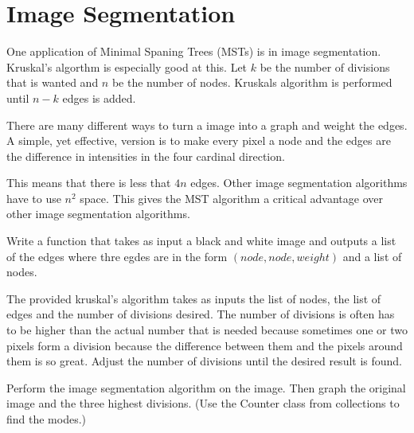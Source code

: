 \label{Ch:MSTImgSeg}


\section*{Image Segmentation}


One application of Minimal Spaning Trees (MSTs) is in image segmentation. Kruskal's algorthm is especially good at this. Let $k$ be the number of divisions that is wanted and $n$ be the number of nodes. Kruskals algorithm is performed until $n-k$ edges is added.

There are many different ways to turn a image into a graph and weight the edges. A simple, yet effective, version is to make every pixel a node and the edges are the difference in intensities in the four cardinal direction. 

This means that there is less that $4n$ edges. Other image segmentation algorithms have to use $n^2$ space. This gives the MST algorithm a critical advantage over other image segmentation algorithms. 

\begin{problem}
Write a function that takes as input a black and white image and outputs a list of the edges where thre egdes are in the form $(node,node,weight)$ and a list of nodes.
\end{problem}

The provided kruskal's algorithm takes as inputs the list of nodes, the list of edges and the number of divisions desired. The number of divisions is often has to be higher than the actual number that is needed because sometimes one or two pixels form a division because the difference between them and the pixels around them is so great. Adjust the number of divisions until the desired result is found.

\begin{problem}
Perform the image segmentation algorithm on the image. Then graph the original image and the three highest divisions. (Use the Counter class from collections to find the modes.) 
\end{problem}


